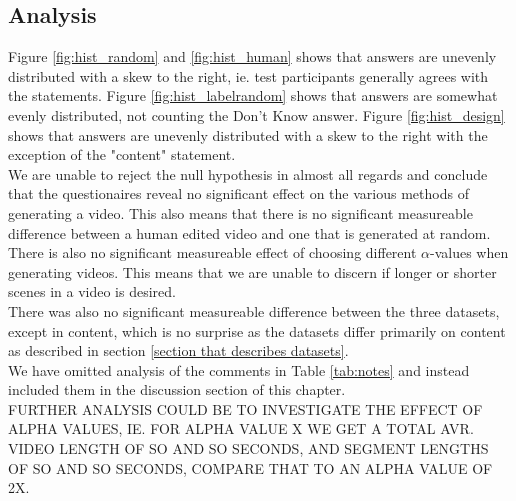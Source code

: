 \subsection{Analysis}
%
Figure \ref{fig:hist_random} and \ref{fig:hist_human} shows that answers are unevenly distributed with a skew to the right, ie. test participants generally agrees with the statements. Figure \ref{fig:hist_labelrandom} shows that answers are somewhat evenly distributed, not counting the Don't Know answer. Figure \ref{fig:hist_design} shows that answers are unevenly distributed with a skew to the right with the exception of the "content" statement.\\
We are unable to reject the null hypothesis in almost all regards and conclude that the questionaires reveal no significant effect on the various methods of generating a video. This also means that there is no significant measureable difference between a human edited video and one that is generated at random.\\
%
There is also no significant measureable effect of choosing different $\alpha$-values when generating videos. This means that we are unable to discern if longer or shorter scenes in a video is desired.\\
%
There was also no significant measureable difference between the three datasets, except in content, which is no surprise as the datasets differ primarily on content as described in section \ref{section that describes datasets}.\\
%
We have omitted analysis of the comments in Table \ref{tab:notes} and instead included them in the discussion section of this chapter.\\
%
FURTHER ANALYSIS COULD BE TO INVESTIGATE THE EFFECT OF ALPHA VALUES, IE. FOR ALPHA VALUE X WE GET A TOTAL AVR. VIDEO LENGTH OF SO AND SO SECONDS, AND SEGMENT LENGTHS OF SO AND SO SECONDS, COMPARE THAT TO AN ALPHA VALUE OF 2X.\\
%
